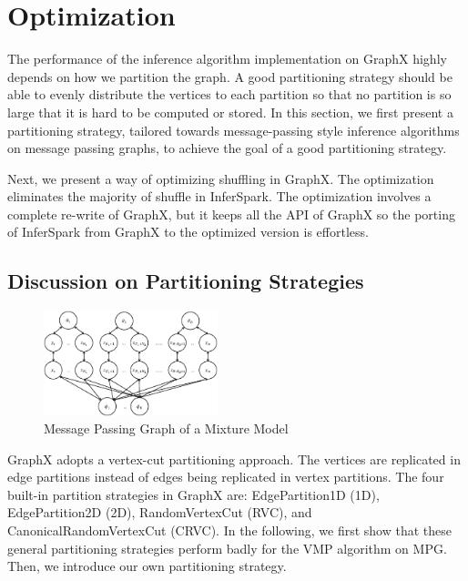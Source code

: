 \section{Optimization}
\label{sec:optimization}

The performance of the inference algorithm implementation on GraphX highly
depends on how we partition the graph. A good partitioning strategy should be
able to evenly distribute the vertices to each partition so that no partition
is so large that it is hard to be computed or stored.  In this section, we
first present a partitioning strategy, tailored towards message-passing style
inference algorithms on message passing graphs, to achieve the goal of a good
partitioning strategy.

Next, we present a way of optimizing shuffling in GraphX. The optimization
eliminates the majority of shuffle in InferSpark. The optimization involves a
complete re-write of GraphX, but it keeps all the API of GraphX so the porting
of InferSpark from GraphX to the optimized version is effortless.

\subsection{Discussion on Partitioning Strategies}

\begin{figure}[h]
	\includegraphics[width=0.45\textwidth]{figs/mixture_mpg.eps}
	\caption{Message Passing Graph of a Mixture Model}
	\label{fig:mixture_mpg}
\end{figure}

GraphX adopts a vertex-cut partitioning approach.
The vertices are replicated in edge partitions instead of edges being replicated in vertex
partitions. 
The four built-in partition
strategies in GraphX are: 
EdgePartition1D (1D),
EdgePartition2D  (2D),
RandomVertexCut (RVC), and
CanonicalRandomVertexCut (CRVC).
In the following, we first show that these general 
partitioning strategies perform badly for the VMP algorithm on MPG.
Then, we introduce our own partitioning strategy.

